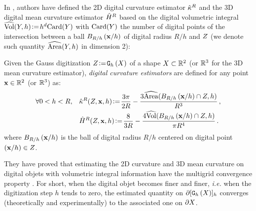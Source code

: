 \documentclass{llncs}
\newcommand{\ie}{\emph{i.e.} }
\begin{document}
In \cite{DGCI2013}, authors have defined the 2D digital curvature estimator
$\hat{\kappa}^{R}$ and the 3D digital mean curvature estimator $\hat{H}^{R}$ based on
the digital volumetric integral $\widehat{\mathrm{Vol}}(Y,h) \!\mathrel{\mathop:}=\! h^d \mathrm{Card}(Y)$ with
$\mathrm{Card}(Y)$ the number of digital points of the intersection between a ball
$B_{R/h}\left(\mathbf{x}/h\right)$ of digital radius $R/h$ and $Z$ (we denote such
quantity $\widehat{\mathrm{Area}}(Y,h)$ in dimension 2):
%
\begin{Definition}
  Given the Gauss digitization $Z\!\mathrel{\mathop:}=\!\mathtt{G}_{h}\left(X\right)$ of a shape $X \subset {\mathbb{R}}^2$
  (or ${\mathbb{R}}^3$ for the 3D mean curvature estimator), {\em digital curvature
  estimators} are defined for any point $\mathbf{x} \in {\mathbb{R}}^2$ (or ${\mathbb{R}}^3$) as:
  \begin{align}
    \forall 0 < h < R,\quad
    &\hat{\kappa}^{R}(Z,\mathbf{x},h) \!\mathrel{\mathop:}=\! \frac{3\pi}{2R}
    - \frac{3\widehat{\mathrm{Area}}(B_{R/h}\left(\mathbf{x}/h\right) \cap
    {Z}, h)}{R^3}\,,\label{eq:dig-curvature-estimator-k}\\
    &\hat{H}^{R}(Z,\mathbf{x},h) \!\mathrel{\mathop:}=\! \frac{8}{3R}
    - \frac{4\widehat{\mathrm{Vol}}(B_{R/h}\left(\mathbf{x}/h\right) \cap
    Z, h)}{\pi R^4}\,.\label{eq:dig-curvature-estimator-H}
  \end{align}
  where $B_{R/h}\left(\mathbf{x}/h\right)$ is the ball of digital radius $R/h$ centered on
  digital point $(\mathbf{x}/h) \in Z$.
\end{Definition}
%
They have proved that estimating the 2D curvature and 3D mean curvature on digital
objets with volumetric integral information have the multigrid convergence
property \cite{DGCI2013}. For short, when the digital objet becomes finer and
finer, \ie when the digitization step $h$ tends to zero, the estimated quantity
on $\partial \lbrack \mathtt{G}_{h}\left(X\right) \rbrack_{h}$ converges (theoretically and experimentally) to the
associated one on $\partial X$.
%
\end{document}
